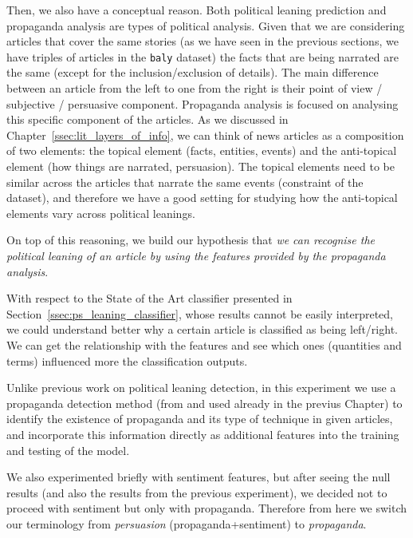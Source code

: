 Then, we also have a conceptual reason. Both political leaning prediction and propaganda analysis are types of political analysis.
Given that we are considering articles that cover the same stories (as we have seen in the previous sections, we have triples of articles in the \texttt{baly} dataset) the facts that are being narrated are the same (except for the inclusion/exclusion of details). The main difference between an article from the left to one from the right is their point of view / subjective / persuasive component. Propaganda analysis is focused on analysing this specific component of the articles.
As we discussed in Chapter~\ref{ssec:lit_layers_of_info}, we can think of news articles as a composition of two elements: the topical element (facts, entities, events) and the anti-topical element (how things are narrated, persuasion).
The topical elements need to be similar across the articles that narrate the same events (constraint of the dataset), and therefore we have a good setting for studying how the anti-topical elements vary across political leanings. 

On top of this reasoning, we build our hypothesis that \emph{we can recognise the political leaning of an article by using the features provided by the propaganda analysis}.

With respect to the State of the Art classifier presented in Section~\ref{ssec:ps_leaning_classifier}, whose results cannot be easily interpreted, we could understand better why a certain article is classified as being left/right. We can get the relationship with the features and see which ones (quantities and terms) influenced more the classification outputs. 



Unlike previous work on political leaning detection, in this experiment we use a propaganda detection method (from \citet{da2019fine} and used already in the previus Chapter) to identify the existence of propaganda and its type of technique in given articles, and incorporate this information directly as additional features into the training and testing of the model.  

We also experimented briefly with sentiment features, but after seeing the null results (and also the results from the previous experiment), we decided not to proceed with sentiment but only with propaganda. Therefore from here we switch our terminology from \emph{persuasion} (propaganda+sentiment) to \emph{propaganda}.

